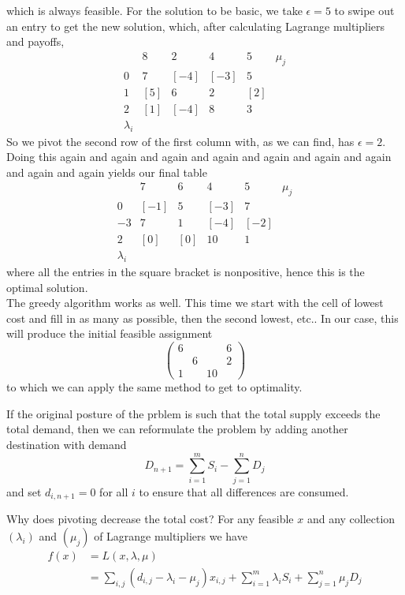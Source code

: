 \begin{example}
    which is always feasible.
    For the solution to be basic, we take $\epsilon=5$ to swipe out an entry to get the new solution, which, after calculating Lagrange multipliers and payoffs,
    $$\begin{array}{c|cccc|c}
        &8&2&4&5&\mu_j\\ \hline
        0&7&[-4]&[-3]&5&\\
        1&[5]&6&2&[2]&\\
        2&[1]&[-4]&8&3&\\ \hline
        \lambda_i&&&&&
    \end{array}$$
    So we pivot the second row of the first column with, as we can find, has $\epsilon=2$.
    Doing this again and again and again and again and again and again and again and again and again yields our final table
    $$\begin{array}{c|cccc|c}
        &7&6&4&5&\mu_j\\ \hline
        0&[-1]&5&[-3]&7&\\
        -3&7&1&[-4]&[-2]&\\
        2&[0]&[0]&10&1&\\ \hline
        \lambda_i&&&&&
    \end{array}$$
    where all the entries in the square bracket is nonpositive, hence this is the optimal solution.\\
    The greedy algorithm works as well.
    This time we start with the cell of lowest cost and fill in as many as possible, then the second lowest, etc..
    In our case, this will produce the initial feasible assignment
    $$\begin{pmatrix}
        6&&&6\\
        &6&&2\\
        1&&10&
    \end{pmatrix}$$
    to which we can apply the same method to get to optimality.
\end{example}
\begin{remark}
    If the original posture of the prblem is such that the total supply exceeds the total demand, then we can reformulate the problem by adding another destination with demand
    $$D_{n+1}=\sum_{i=1}^mS_i-\sum_{j=1}^nD_j$$
    and set $d_{i,n+1}=0$ for all $i$ to ensure that all differences are consumed.
\end{remark}
Why does pivoting decrease the total cost?
For any feasible $x$ and any collection $(\lambda_i)$ and $(\mu_j)$ of Lagrange multipliers we have
\begin{align*}
    f(x)&=L(x,\lambda,\mu)\\
    &=\sum_{i,j}(d_{i,j}-\lambda_i-\mu_j)x_{i,j}+\sum_{i=1}^m\lambda_iS_i+\sum_{j=1}^n\mu_jD_j
\end{align*}
